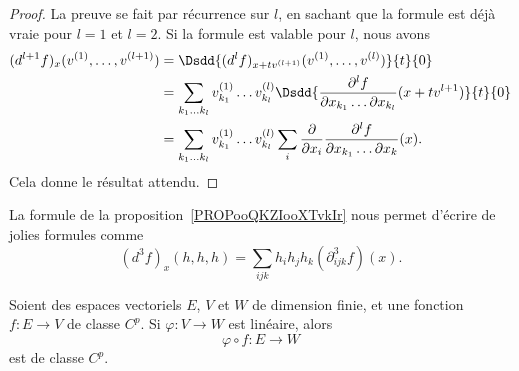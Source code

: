 \begin{proof}
	La preuve se fait par récurrence sur \( l\), en sachant que la formule est déjà vraie pour \( l=1\) et \( l=2\). Si la formule est valable pour \( l\), nous avons
	\begin{subequations}
		\begin{align}
			(d^{l+1}f)_x(v^{(1)},\ldots, v^{(l+1)}) & =\Dsdd{ (d^lf)_{x+tv^{(l+1)}}(v^{(1)},\ldots, v^{(l)}) }{t}{0}                                                                                                \\
			                                        & =\sum_{k_1\ldots k_l}v_{k_1}^{(1)}\ldots v_{k_l}^{(l)}\Dsdd{   \frac{ \partial^lf }{ \partial x_{k_1}\ldots \partial x_{k_l} }(x+tv^{l+1})   }{t}{0}          \\
			                                        & =\sum_{k_1\ldots k_l}v_{k_1}^{(1)}\ldots v_{k_l}^{(l)}\sum_i\frac{ \partial  }{ \partial x_i }\frac{ \partial^lf }{ \partial x_{k_1}\ldots \partial x_k }(x).
		\end{align}
	\end{subequations}
	Cela donne le résultat attendu.
\end{proof}

\begin{normaltext}
	La formule de la proposition~\ref{PROPooQKZIooXTvkIr} nous permet d'écrire de jolies formules comme
	\begin{equation}        \label{EQooXRWWooMoKoOB}
		(d^3f)_x(h,h,h)=\sum_{ijk}h_ih_jh_k(\partial^3_{ijk}f)(x).
	\end{equation}
\end{normaltext}

\begin{proposition}
	Soient des espaces vectoriels \( E\),  \( V\) et \( W\) de dimension finie, et une fonction \( f\colon E\to V\) de classe \( C^p\). Si \( \varphi\colon V\to W\) est linéaire, alors
	\begin{equation}
		\varphi\circ f\colon E\to W
	\end{equation}
	est de classe \( C^p\).
\end{proposition}

